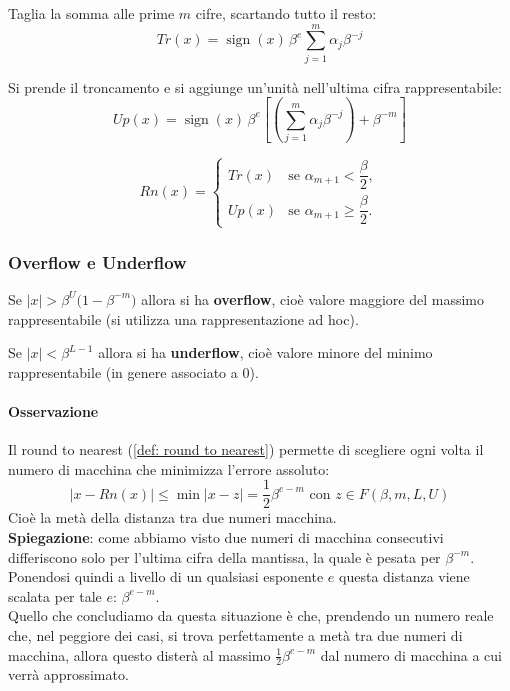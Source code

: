 \documentclass[12pt,a4paper,]{report}
\begin{document}
\begin{definizione}
    Taglia la somma alle prime $m$ cifre, scartando tutto il resto:
    \[
    Tr(x)
    = \operatorname{sign}(x)\,\beta^{e}
    \sum_{j=1}^{m} \alpha_j \beta^{-j}
    \]
\end{definizione}
\begin{definizione}
    [Round up]
    Si prende il troncamento e si aggiunge un'unità nell'ultima cifra rappresentabile:
    \[
    Up(x)
    = \operatorname{sign}(x)\,\beta^{e}
    \left[
    \left(
        \sum_{j=1}^{m} \alpha_j \beta^{-j}
    \right)
    + \beta^{-m}
    \right]
    \]
\end{definizione}
\begin{definizione}
    \label{def: round to nearest}
    \[
    Rn(x)=
    \begin{cases}
    Tr(x) & \text{se } \alpha_{m+1} < \dfrac{\beta}{2},\\[6pt]
    Up(x) & \text{se } \alpha_{m+1} \ge \dfrac{\beta}{2}.
    \end{cases}
    \]
\end{definizione}

\subsubsection{Overflow e Underflow}
\begin{definizione}
    [Overflow]
    Se $ |x| > \beta^{U}\bigl(1-\beta^{-m}\bigr) $
    allora si ha \textbf{overflow}, cio\`e valore maggiore del massimo rappresentabile (si utilizza una rappresentazione ad hoc).
\end{definizione}
\begin{definizione}
    [Underflow]
    Se $|x| < \beta^{L-1}$ allora si ha \textbf{underflow}, cio\`e valore minore del minimo rappresentabile
    (in genere associato a $0$).
\end{definizione}

\paragraph{Osservazione}
Il round to nearest (\autoref{def: round to nearest}) permette di scegliere ogni volta il numero di macchina che minimizza l'errore assoluto:
\[
|x - Rn(x)| \leq \min |x - z| = \frac{1}{2}\beta^{e-m} \text{ con } z \in F(\beta, m, L, U)
\]
Cioè la metà della distanza tra due numeri macchina.\\
\textbf{Spiegazione}: come abbiamo visto due numeri di macchina consecutivi differiscono solo per l'ultima cifra della mantissa, la quale è pesata per $\beta^{-m}$.
Ponendosi quindi a livello di un qualsiasi esponente $e$  questa distanza viene scalata per tale $e$: $\beta^{e-m}$.\\
Quello che concludiamo da questa situazione è che, prendendo un numero reale che, nel peggiore dei casi, si trova perfettamente a metà tra due numeri di macchina, allora questo disterà al massimo $\frac{1}{2}\beta^{e-m}$ dal numero di macchina a cui verrà approssimato.
\end{document}
